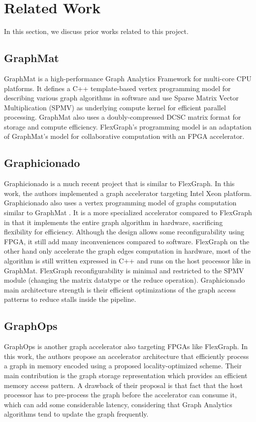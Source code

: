 \section{Related Work}

In this section, we discuss prior works related to this project. 

\subsection{GraphMat}

GraphMat \cite{GraphMat} is a high-performance Graph Analytics Framework for multi-core CPU platforms. It defines a C++ template-based vertex programming model for describing various graph algorithms in software and use Sparse Matrix Vector Multiplication (SPMV) as underlying compute kernel for efficient parallel processing. GraphMat also uses a doubly-compressed DCSC \cite{DCSC} matrix format for storage and compute efficiency. FlexGraph's programming model is an adaptation of GraphMat's model for collaborative computation  with an FPGA accelerator.

\subsection{Graphicionado}

Graphicionado \cite{Graphicionado} is a much recent project that is similar to FlexGraph. In this work, the authors implemented a graph accelerator targeting Intel Xeon platform. Graphicionado also uses a vertex programming model of graphs computation similar to GraphMat \cite{GraphMat}. It is a more specialized accelerator compared to FlexGraph in that it implements the entire graph algorithm in hardware, sacrificing flexibility for efficiency. Although the design allows some reconfigurability using FPGA, it still add many inconveniences compared to software. FlexGraph on the other hand only accelerate the graph edges computation in hardware, most of the algorithm is still written expressed in C++ and runs on the host processor like in GraphMat. FlexGraph reconfigurability is minimal and restricted to the SPMV module (changing the matrix datatype or the reduce operation). Graphicionado main architecture strength is their efficient optimizations of the graph access patterns to reduce stalls inside the pipeline.  

\subsection{GraphOps}

GraphOps \cite{GraphOps} is another graph accelerator also targeting FPGAs like FlexGraph. In this work, the authors propose an accelerator architecture that efficiently process a graph in memory encoded using a proposed locality-optimized scheme. Their main contribution is the graph storage representation which provides an efficient memory access pattern. A drawback of their proposal is that fact that the host processor has to pre-process the graph before the accelerator can consume it, which can add some considerable latency, considering that Graph Analytics algorithms tend to update the graph frequently.